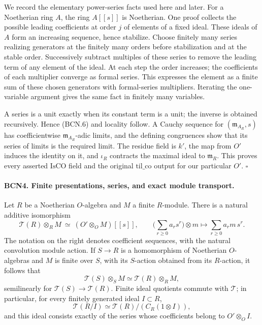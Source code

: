 We record the elementary power-series facts used here and later.
For a Noetherian ring \(A\), the ring \(A[[s]]\) is Noetherian.
One proof collects the possible leading coefficients at order
\(j\) of elements of a fixed ideal.  These ideals of \(A\) form
an increasing sequence, hence stabilize.  Choose finitely many
series realizing generators at the finitely many orders before
stabilization and at the stable order.  Successively subtract
multiples of these series to remove the leading term of any
element of the ideal.  At each step the order increases;
the coefficients of each multiplier converge as formal series.
This expresses the element as a finite sum of these chosen
generators with formal-series multipliers.  Iterating the
one-variable argument gives the same fact in finitely many
variables.

A series is a unit exactly when its constant term is a unit;
the inverse is obtained recursively.  Hence (BCN.6) and locality
follow.  A Cauchy sequence for \((\mathfrak m_{A_R},s)\) has
coefficientwise \(\mathfrak m_{A_R}\)-adic limits, and the defining
congruences show that its series of limits is the required limit.
The residue field is \(k'\), the map from \(O'\) induces the
identity on it, and \(\iota_R\) contracts the maximal ideal to
\(\mathfrak m_R\).  This proves every asserted \(\mathrm{IsCO}\)
field and the original \(\mathrm{til\_co}\) output for our
particular \(O'\).
\hfill\(\square\)

\paragraph{BCN4. Finite presentations, series, and exact module transport.}\label{claim:BCN4}
Let \(R\) be a Noetherian \(O\)-algebra and \(M\) a finite
\(R\)-module.  There is a natural additive isomorphism
\[
 \mathscr T(R)\otimes_R M
 \ \simeq\ (O'\otimes_O M)[[s]],\qquad
 \Big(\sum_{r\ge0}a_rs^r\Big)\otimes m
 \longmapsto \sum_{r\ge0}a_r m\,s^r .
 \tag{BCN.7}
\]
The notation on the right denotes coefficient sequences, with
the natural convolution module action.
If \(S\to R\) is a homomorphism of Noetherian \(O\)-algebras and
\(M\) is finite over \(S\), with its \(S\)-action obtained from
its \(R\)-action, it follows that
\[
 \mathscr T(S)\otimes_S M\simeq
 \mathscr T(R)\otimes_R M,                         \tag{BCN.8}
\]
semilinearly for \(\mathscr T(S)\to\mathscr T(R)\).
Finite ideal quotients commute with \(\mathscr T\); in particular,
for every finitely generated ideal \(I\subset R\),
\[
 \mathscr T(R/I)\simeq
 \mathscr T(R)/(C_R(1\otimes I)),                  \tag{BCN.9}
\]
and this ideal consists exactly of the series whose coefficients
belong to \(O'\otimes_O I\).

